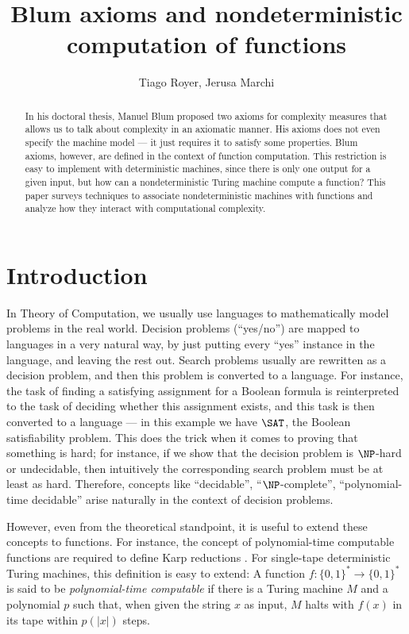 \documentclass[12pt]{article}
\title{Blum axioms and nondeterministic computation of functions}
\author{Tiago Royer\inst{1}, Jerusa Marchi\inst{1}}
\theoremstyle{definition}
\begin{document}
\maketitle

\begin{abstract}
    In his doctoral thesis,
    Manuel Blum proposed two axioms for complexity measures
    that allows us to talk about complexity in an axiomatic manner.
    His axioms does not even specify the machine model
    --- it just requires it to satisfy some properties.
    Blum axioms, however,
    are defined in the context of function computation.
    This restriction is easy to implement with deterministic machines,
    since there is only one output for a given input,
    but how can a nondeterministic Turing machine compute a function?
    This paper surveys techniques to associate
    nondeterministic machines with functions
    and analyze how they interact with computational complexity.
\end{abstract}

\section{Introduction}

In Theory of Computation,
we usually use languages
to mathematically model problems in the real world.
Decision problems (``yes/no'') are mapped to languages in a very natural way,
by just putting every ``yes'' instance in the language,
and leaving the rest out.
Search problems usually are rewritten as a decision problem,
and then this problem is converted to a language.
For instance,
the task of finding a satisfying assignment for a Boolean formula
is reinterpreted to the task of deciding whether this assignment exists,
and this task is then converted to a language
--- in this example we have $\SAT$, the Boolean satisfiability problem.
This does the trick when it comes to proving that something is hard;
for instance, if we show that the decision problem is $\NP$-hard or undecidable,
then intuitively the corresponding search problem must be at least as hard.
Therefore,
concepts like ``decidable'', ``$\NP$-complete'', ``polynomial-time decidable''
arise naturally in the context of decision problems.

However, even from the theoretical standpoint,
it is useful to extend these concepts to functions.
For instance,
the concept of polynomial-time computable functions
are required to define Karp reductions \cite[p.~42]{AroraBarak2009}.
For single-tape deterministic Turing machines,
this definition is easy to extend:
A function $f : \{0, 1\}^* \to \{0, 1\}^*$
is said to be \emph{polynomial-time computable}
if there is a Turing machine $M$ and a polynomial $p$ such that,
when given the string $x$ as input,
$M$ halts with $f(x)$ in its tape within $p(|x|)$ steps.
\end{document}
